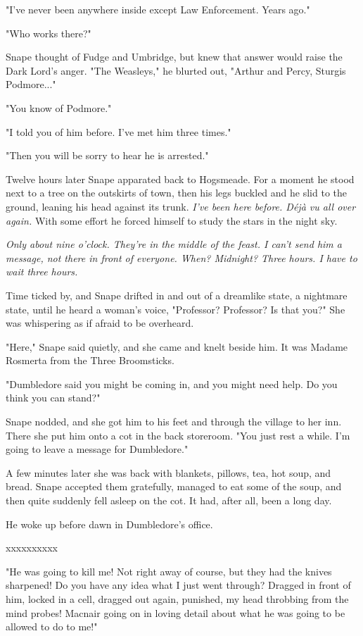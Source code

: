\documentclass[a4paper,11pt]{article}
\begin{document}
"I've never been anywhere inside except Law Enforcement. Years ago."

"Who works there?"

Snape thought of Fudge and Umbridge, but knew that answer would raise the Dark Lord's anger. "The Weasleys," he blurted out, "Arthur and Percy, Sturgis Podmore..."

"You know of Podmore."

"I told you of him before. I've met him three times."

"Then you will be sorry to hear he is arrested."

Twelve hours later Snape apparated back to Hogsmeade. For a moment he stood next to a tree on the outskirts of town, then his legs buckled and he slid to the ground, leaning his head against its trunk. \emph{I've been here before. Déjà vu all over again.} With some effort he forced himself to study the stars in the night sky.

\emph{Only about nine o'clock. They're in the middle of the feast. I can't send him a message, not there in front of everyone. When? Midnight? Three hours. I have to wait three hours.}

Time ticked by, and Snape drifted in and out of a dreamlike state, a nightmare state, until he heard a woman's voice, "Professor? Professor? Is that you?" She was whispering as if afraid to be overheard.

"Here," Snape said quietly, and she came and knelt beside him. It was Madame Rosmerta from the Three Broomsticks.

"Dumbledore said you might be coming in, and you might need help. Do you think you can stand?"

Snape nodded, and she got him to his feet and through the village to her inn. There she put him onto a cot in the back storeroom. "You just rest a while. I'm going to leave a message for Dumbledore."

A few minutes later she was back with blankets, pillows, tea, hot soup, and bread. Snape accepted them gratefully, managed to eat some of the soup, and then quite suddenly fell asleep on the cot. It had, after all, been a long day.

He woke up before dawn in Dumbledore's office.

xxxxxxxxxx

"He was going to kill me! Not right away of course, but they had the knives sharpened! Do you have any idea what I just went through? Dragged in front of him, locked in a cell, dragged out again, punished, my head throbbing from the mind probes! Macnair going on in loving detail about what he was going to be allowed to do to me!"
\end{document}
